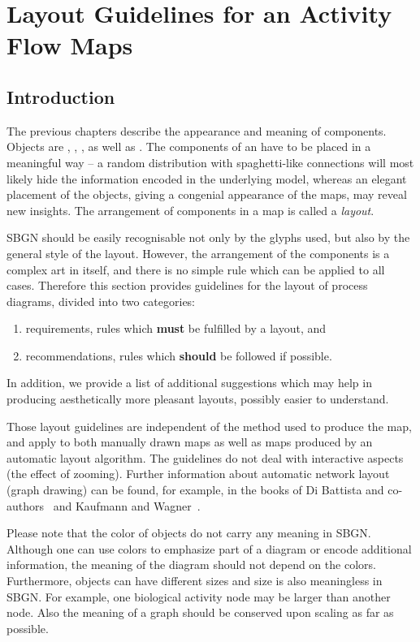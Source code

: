 \chapter{Layout Guidelines for an Activity Flow Maps}
\label{chp:af:layout}

\section{Introduction}

The previous chapters describe the appearance and meaning of \SBGNAFLone components. Objects are , , ,  as well as . The components of an \AFm have to be placed in a meaningful way -- a random distribution with spaghetti-like connections will most likely hide the information encoded in the underlying model, whereas an elegant placement of the objects, giving a congenial appearance of the maps, may reveal new insights. The arrangement of components in a map is called a \emph{layout}.

SBGN \AFs should be easily recognisable not only by the glyphs used, but also by the general style of the layout. However, the arrangement of the components is a complex art in itself, and there is no simple rule which can be applied to all cases. Therefore this section provides guidelines for the layout of process diagrams, divided into two categories:
\begin{enumerate}
  \item requirements, \ie rules which \textbf{must} be fulfilled by a layout, and
  \item recommendations, \ie rules which \textbf{should} be followed if possible.
\end{enumerate}
In addition, we provide a list of additional suggestions which may help in producing aesthetically more pleasant layouts, possibly easier to understand.

Those layout guidelines are independent of the method used to produce the map, and apply to both manually drawn maps as well as maps produced by an automatic layout algorithm. The guidelines do not deal with interactive aspects (\eg the effect of zooming). Further information about automatic network layout (graph drawing) can be found, for example, in the books of Di Battista and co-authors~\cite{DiBattista:1998} and Kaufmann and Wagner~\cite{Kaufmann:2001}.

Please note that the color of objects do not carry any meaning in SBGN. Although one can use colors to emphasize part of a diagram or encode additional information, the meaning of the diagram should not depend on the colors. Furthermore, objects can have different sizes and size is also meaningless in SBGN. For example, one biological activity node may be larger than another node. Also the meaning of a graph should be conserved upon scaling as far as possible.


